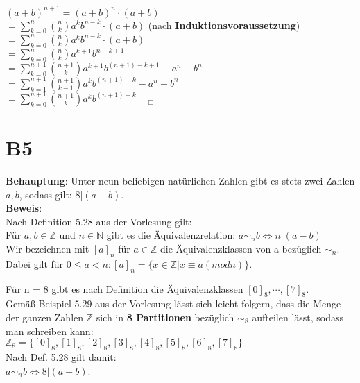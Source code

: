 \documentclass[11pt,a4paper]{article}
\begin{document}
$(a + b)^{n+1} = (a + b)^n \cdot (a+b)$ \\
$= \sum \limits_{k=0}^{n}\binom{n}{k}a^kb^{n-k} \cdot (a+b)$  (nach \textbf{Induktionsvoraussetzung}) \\
$= \sum \limits_{k=0}^{n}\binom{n}{k}a^kb^{n-k} \cdot (a+b)$ \\
$= \sum \limits_{k=0}^{n}\binom{n}{k}a^{k+1}b^{n-k+1}$ \\
$= \sum \limits_{k=0}^{n+1}\binom{n+1}{k}a^{k+1}b^{(n+1)-k+1} - a^n - b^n$ \\
$= \sum \limits_{k=1}^{n+1}\binom{n+1}{k-1}a^{k}b^{(n+1)-k} - a^n - b^n$ \\
$= \sum \limits_{k=0}^{n+1}\binom{n+1}{k}a^{k}b^{(n+1)-k}$    $~~~~_{\Box}$\\


\section*{B5}
\textbf{Behauptung}: Unter neun beliebigen natürlichen Zahlen gibt es stets zwei Zahlen $a,b$, sodass gilt: $8|(a-b)$.\\

\textbf{Beweis}: \\

Nach Definition 5.28 aus der Vorlesung gilt: \\

Für $a, b \in \mathbb{Z}$ und $n \in \mathbb{N}$ gibt es die Äquivalenzrelation: 
$a \sim_n b \Leftrightarrow n | (a-b)$ \\
Wir bezeichnen mit $[a]_n$ für $a \in \mathbb{Z}$ die Äquivalenzklassen von a bezüglich $\sim_n$. \\
Dabei gilt für $0 \leq a < n: [a]_n = \{x \in \mathbb{Z} | x \equiv a (mod n)\}$.

Für n = 8 gibt es nach Definition die Äquivalenzklassen $[0]_8,\cdots,[7]_8$. \\
Gemäß Beispiel 5.29 aus der Vorlesung lässt sich leicht folgern, dass die Menge der ganzen Zahlen $\mathbb{Z}$ sich in \textbf{8 Partitionen} bezüglich $\sim_8$ aufteilen lässt, sodass man schreiben kann: \\

$\mathbb{Z}_8 = \{[0]_8, [1]_8, [2]_8, [3]_8, [4]_8, [5]_8, [6]_8, [7]_8\}$ \\

Nach Def. 5.28 gilt damit: \\

$a \sim_n b \Leftrightarrow 8 | (a-b)$. \\
\end{document}
